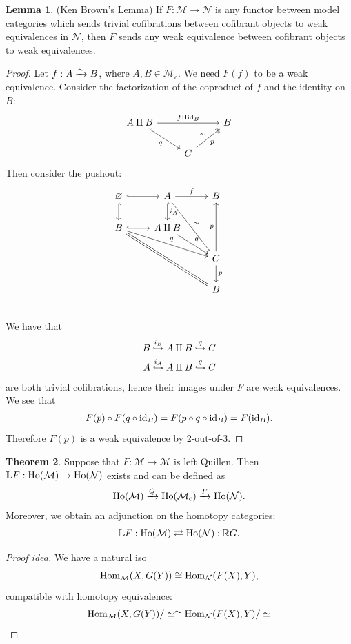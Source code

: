 \documentclass[12pt]{amsart}
\theoremstyle{definition}
\newtheorem{theorem}{Theorem}[section]
\newtheorem{lemma}[theorem]{Lemma}
\let\emptyset\varnothing
\begin{document}
\begin{lemma} (Ken Brown's Lemma) If $F: \mathcal{M} \to \mathcal{N}$ is any functor between model categories which sends trivial cofibrations between cofibrant objects to weak equivalences in $\mathcal{N}$, then $F$ sends any weak equivalence between cofibrant objects to weak equivalences.
\end{lemma}
\begin{proof} Let $f: A \xrightarrow{\sim} B$, where $A,B \in \mathcal{M}_c$. We need $F(f)$ to be a weak equivalence. Consider the factorization of the coproduct of $f$ and the identity on $B$:
\[ \begin{tikzcd}
    A\amalg B\ar[rr,"f\amalg \id_B"]\ar[dr,hook,"q" below left] &  & B\\
     & C\ar[ur,"\sim" above left,"p" below right,two heads] &
\end{tikzcd} \]
Then consider the pushout:
\[ \begin{tikzcd}
    \emptyset\rar[hook]\dar[hook] & A\dar[hook,"i_A"]\rar["f"]\ar[ddr,"\sim"] & B & \\
    B\rar[hook]\ar[drr,"q"]\ar[ddrr,equal] & A\amalg B\ar[dr,"q"] &  & \\
     &  & C\dar["p"]\ar[uu,"p"] & \\
     &  & B & \\
\end{tikzcd} \]
We have that
\begin{align*}
    B \overset{i_B}{\hookrightarrow} A\amalg B \overset{q}{\hookrightarrow} C \\
    A \overset{i_A}{\hookrightarrow} A\amalg B \overset{q}{\hookrightarrow} C 
\end{align*}
are both trivial cofibrations, hence their images under $F$ are weak equivalences. We see that
\begin{align*}
    F(p)\circ F(q\circ \text{id}_B) = F(p\circ q\circ \text{id}_B) = F(\text{id}_B).
\end{align*}
Therefore $F(p)$ is a weak equivalence by 2-out-of-3.
\end{proof}

\begin{theorem} Suppose that $F:\mathcal{M}\to \mathcal{M}$ is left Quillen. Then $\mathbb{L}F:\text{Ho}(\mathcal{M})\to \text{Ho}(\mathcal{N})$ exists and can be defined as
\begin{align*}
    \text{Ho}(\mathcal{M})\xrightarrow{Q} \text{Ho}(\mathcal{M}_c) \xrightarrow{F} \text{Ho}(\mathcal{N}).
\end{align*}
Moreover, we obtain an adjunction on the homotopy categories:
\begin{align*}
    \mathbb{L}F: \text{Ho}(\mathcal{M}) \rightleftarrows \text{Ho}(\mathcal{N}): \mathbb{R}G.
\end{align*}
\end{theorem}
\begin{proof}[Proof idea] We have a natural iso
\begin{align*}
    \text{Hom}_\mathcal{M}(X,G(Y)) \cong \text{Hom}_\mathcal{N}(F(X),Y),
\end{align*}
compatible with homotopy equivalence:
\begin{align*}
    \text{Hom}_\mathcal{M}(X,G(Y))/\simeq \cong \text{Hom}_\mathcal{N}(F(X),Y)/\simeq
\end{align*}
\end{proof}
\end{document}
